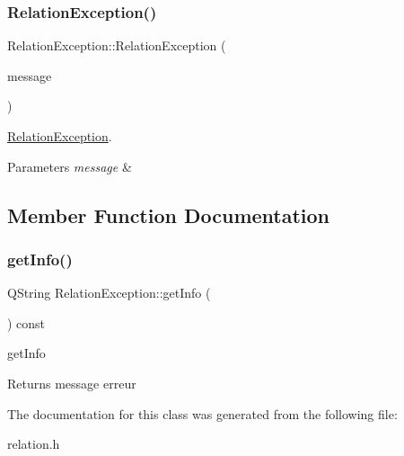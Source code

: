 \subsubsection{\texorpdfstring{Relation\+Exception()}{RelationException()}}
{\footnotesize\ttfamily Relation\+Exception\+::\+Relation\+Exception (\begin{DoxyParamCaption}\item[{const Q\+String \&}]{message }\end{DoxyParamCaption})\hspace{0.3cm}{\ttfamily [inline]}}



\hyperlink{class_relation_exception}{Relation\+Exception}. 


\begin{DoxyParams}{Parameters}
{\em message} & \\
\hline
\end{DoxyParams}


\subsection{Member Function Documentation}
\mbox{\label{class_relation_exception_a3405178340ee7f62a2a38728a4325aab}} 
\subsubsection{\texorpdfstring{get\+Info()}{getInfo()}}
{\footnotesize\ttfamily Q\+String Relation\+Exception\+::get\+Info (\begin{DoxyParamCaption}{ }\end{DoxyParamCaption}) const\hspace{0.3cm}{\ttfamily [inline]}}



get\+Info 

\begin{DoxyReturn}{Returns}
message erreur 
\end{DoxyReturn}


The documentation for this class was generated from the following file\+:\begin{DoxyCompactItemize}
\item 
relation.\+h\end{DoxyCompactItemize}
